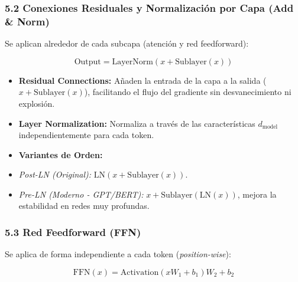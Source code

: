 \documentclass[11pt,oneside]{article}
\begin{document}
\subsubsection{5.2 Conexiones Residuales y Normalización por Capa (Add \& Norm)}

Se aplican alrededor de cada subcapa (atención y red feedforward):

\[\text{Output} = \text{LayerNorm}(x + \text{Sublayer}(x))\]

\begin{itemize}

\item \textbf{Residual Connections:} Añaden la entrada de la capa a la salida (\(x + \text{Sublayer}(x)\)), facilitando el flujo del gradiente sin desvanecimiento ni explosión.

\end{itemize}

\begin{itemize}

\item \textbf{Layer Normalization:} Normaliza a través de las características \(d_{\text{model}}\) independientemente para cada token.

\end{itemize}

\begin{itemize}

\item \textbf{Variantes de Orden:}

\item \emph{Post-LN (Original):} \(\text{LN}(x + \text{Sublayer}(x))\).

\end{itemize}

\begin{itemize}

\item \emph{Pre-LN (Moderno - GPT/BERT):} \(x + \text{Sublayer}(\text{LN}(x))\), mejora la estabilidad en redes muy profundas.

\end{itemize}

\subsubsection{5.3 Red Feedforward (FFN)}

Se aplica de forma independiente a cada token (\emph{position-wise}):

\[\text{FFN}(x) = \text{Activation}(x W_1 + b_1) W_2 + b_2\]
\end{document}
